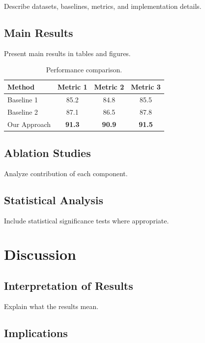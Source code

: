 \documentclass[12pt]{report}
\theoremstyle{dissertation}
\newtheorem theorem}{Theorem}
\newtheorem definition}{Definition}
\newtheorem lemma}{Lemma}
\newtheorem proposition}{Proposition}
\newtheorem corollary}{Corollary}
\begin{document}
Describe datasets, baselines, metrics, and implementation details.

\section{Main Results}

Present main results in tables and figures.

\begin{table}[htbp]
\caption{Performance comparison.}
\label{tab:results}
\begin{center}
\begin{tabular}{|l|c|c|c|}
\hline
Method & Metric 1 & Metric 2 & Metric 3 \\
\hline
Baseline 1 & 85.2 & 84.8 & 85.5 \\
Baseline 2 & 87.1 & 86.5 & 87.8 \\
Our Approach & \textbf{91.3} & \textbf{90.9} & \textbf{91.5} \\
\hline
\end{tabular}
\end{center}
\end{table}

\section{Ablation Studies}

Analyze contribution of each component.

\section{Statistical Analysis}

Include statistical significance tests where appropriate.

\chapter{Discussion}
\label{chapter:discussion}

\section{Interpretation of Results}

Explain what the results mean.

\section{Implications}
\end{document}
